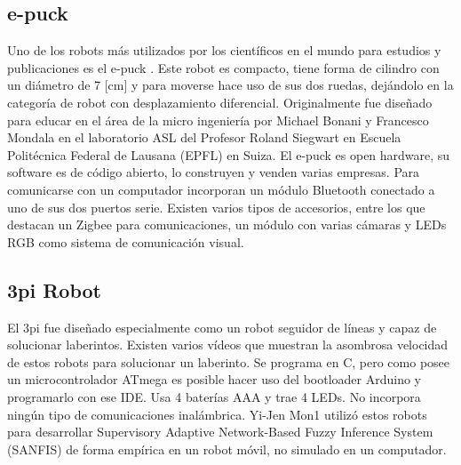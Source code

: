 \subsection{e-puck}
Uno de los robots más utilizados por los científicos en el mundo para estudios y publicaciones es el e-puck \cite{mondada2009puck}. Este robot es compacto, tiene forma de cilindro con un diámetro de 7 [cm] y para moverse hace uso de sus dos ruedas, dejándolo en la categoría de robot con desplazamiento diferencial. Originalmente fue diseñado para educar en el área de la micro ingeniería por Michael Bonani y Francesco Mondala en el laboratorio ASL del Profesor Roland Siegwart en Escuela Politécnica Federal de Lausana (EPFL) en Suiza. El e-puck es open hardware, su software es de código abierto,  lo construyen y venden varias empresas. Para comunicarse con un computador incorporan un módulo Bluetooth conectado a uno de sus dos puertos serie. Existen varios tipos de accesorios, entre los que destacan un Zigbee para comunicaciones, un módulo con varias cámaras y LEDs RGB como sistema de comunicación visual. 

\subsection{3pi Robot}

El 3pi fue diseñado especialmente como un robot seguidor de líneas y capaz de solucionar laberintos. Existen varios vídeos que muestran la asombrosa velocidad de estos robots para solucionar un laberinto. Se programa en C, pero como posee un microcontrolador ATmega es posible hacer uso del bootloader Arduino y programarlo con ese IDE. Usa 4 baterías AAA y trae 4 LEDs. No incorpora ningún tipo de comunicaciones inalámbrica. Yi-Jen Mon1 utilizó estos robots para desarrollar Supervisory Adaptive Network-Based Fuzzy Inference System (SANFIS) de forma empírica en un robot móvil, no simulado en un computador.



